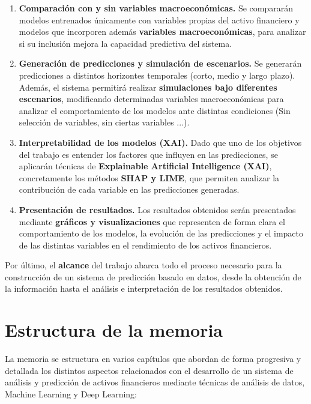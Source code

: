 \begin{enumerate}
    \item \textbf{Comparación con y sin variables macroeconómicas.} Se compararán modelos entrenados únicamente con variables propias del activo financiero y modelos que incorporen además \textbf{variables macroeconómicas}, para analizar si su inclusión mejora la capacidad predictiva del sistema.
    \item \textbf{Generación de predicciones y simulación de escenarios.} Se generarán predicciones a distintos horizontes temporales (corto, medio y largo plazo). Además, el sistema permitirá realizar \textbf{simulaciones bajo diferentes escenarios}, modificando determinadas variables macroeconómicas para analizar el comportamiento de los modelos ante distintas condiciones (Sin selección de variables, sin ciertas variables ...).
    \item \textbf{Interpretabilidad de los modelos (XAI).} Dado que uno de los objetivos del trabajo es entender los factores que influyen en las predicciones, se aplicarán técnicas de \textbf{Explainable Artificial Intelligence (XAI)}, concretamente los métodos \textbf{SHAP y LIME}, que permiten analizar la contribución de cada variable en las predicciones generadas.
    \item \textbf{Presentación de resultados.} Los resultados obtenidos serán presentados mediante \textbf{gráficos y visualizaciones} que representen de forma clara el comportamiento de los modelos, la evolución de las predicciones y el impacto de las distintas variables en el rendimiento de los activos financieros.
\end{enumerate}

Por último, el \textbf{alcance} del trabajo abarca todo el proceso necesario para la construcción de un sistema de predicción basado en datos, desde la obtención de la información hasta el análisis e interpretación de los resultados obtenidos.

\section{Estructura de la memoria}
La memoria se estructura en varios capítulos que abordan de forma progresiva y detallada los distintos aspectos relacionados con el desarrollo de un sistema de análisis y predicción de activos financieros mediante técnicas de análisis de datos, Machine Learning y Deep Learning:

